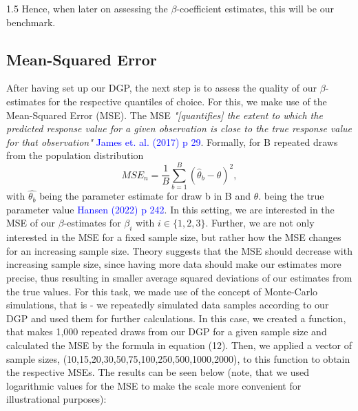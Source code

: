 \documentclass[conference]{IEEEtran}
\begin{document}
\begin{spacing}{1.5}
Hence, when later on assessing the $\beta$-coefficient estimates, this will be our benchmark.

\subsection{\textbf{Mean-Squared Error}}
After having set up our DGP, the next step is to assess the quality of our $\beta$-estimates for the respective quantiles of choice. For this, we make use of the Mean-Squared Error (MSE).
The MSE \textit{"[quantifies] the extent to which the predicted response value for a given observation is close to the true response value for that observation"} \textcolor{blue}{James et. al. (2017) p 29}.
Formally, for B repeated draws from the population distribution
\begin{equation}
MSE_{n} = \frac{1}{B} \sum_{b=1}^{B} ( \hat{\theta}_{b} - \theta)^2,
\end{equation}
with $\hat{\theta_{b}}$ being the parameter estimate for draw b in B and $\theta$. being the true parameter value \textcolor{blue}{Hansen (2022) p 242}.
In this setting, we are interested in the MSE of our $\beta$-estimates for $\beta_{i}$ with $i \in \{1,2,3\}$.
Further, we are not only interested in the MSE for a fixed sample size, but rather how the MSE changes for an increasing sample size. Theory suggests that the MSE should decrease with increasing sample size, since having more data should make our estimates more precise, thus resulting in smaller average squared deviations of our estimates from the true values.
For this task, we made use of the concept of Monte-Carlo simulations, that is - we repeatedly simulated data samples according to our DGP and used them for further calculations. In this case, we created a function, that makes 1,000 repeated draws from our DGP for a given sample size and calculated the MSE by the formula in equation (12). Then, we applied a vector of sample sizes, (10,15,20,30,50,75,100,250,500,1000,2000), to this function to obtain the respective MSEs. The results can be seen below (note, that we used logarithmic values for the MSE to make the scale more convenient for illustrational purposes):


\end{spacing}
\end{document}
